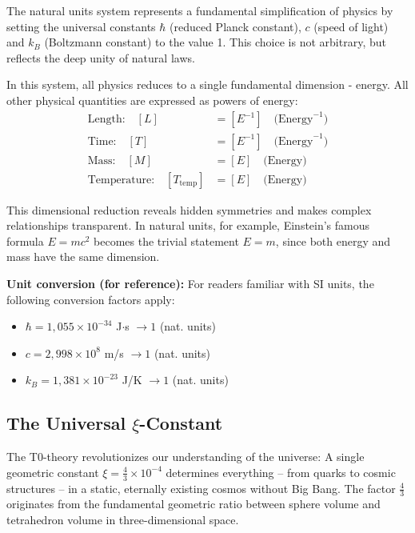 \documentclass[12pt,a4paper]{article}
\theoremstyle{definition}
\theoremstyle{remark}
\begin{document}
	The natural units system represents a fundamental simplification of physics by setting the universal constants $\hbar$ (reduced Planck constant), $c$ (speed of light) and $k_B$ (Boltzmann constant) to the value 1. This choice is not arbitrary, but reflects the deep unity of natural laws.
	
	In this system, all physics reduces to a single fundamental dimension - energy. All other physical quantities are expressed as powers of energy:
	\begin{align}
		\text{Length:} \quad [L] &= [E^{-1}] \quad \text{(Energy}^{-1}\text{)} \\
		\text{Time:} \quad [T] &= [E^{-1}] \quad \text{(Energy}^{-1}\text{)} \\
		\text{Mass:} \quad [M] &= [E] \quad \text{(Energy)} \\
		\text{Temperature:} \quad [T_{\text{temp}}] &= [E] \quad \text{(Energy)}
	\end{align}
	
	This dimensional reduction reveals hidden symmetries and makes complex relationships transparent. In natural units, for example, Einstein's famous formula $E = mc^2$ becomes the trivial statement $E = m$, since both energy and mass have the same dimension.
	
	\textbf{Unit conversion (for reference):}
	For readers familiar with SI units, the following conversion factors apply:
	\begin{itemize}
		\item $\hbar = 1{,}055 \times 10^{-34}$ J$\cdot$s $\rightarrow 1$ (nat. units)
		\item $c = 2{,}998 \times 10^8$ m/s $\rightarrow 1$ (nat. units)  
		\item $k_B = 1{,}381 \times 10^{-23}$ J/K $\rightarrow 1$ (nat. units)
	\end{itemize}
	
	\subsection{The Universal $\xi$-Constant}
	
	\begin{revolutionary}
		The T0-theory revolutionizes our understanding of the universe: A single geometric constant $\xi = \frac{4}{3} \times 10^{-4}$ determines everything -- from quarks to cosmic structures -- in a static, eternally existing cosmos without Big Bang. The factor $\frac{4}{3}$ originates from the fundamental geometric ratio between sphere volume and tetrahedron volume in three-dimensional space.
	\end{revolutionary}
	
\end{document}
